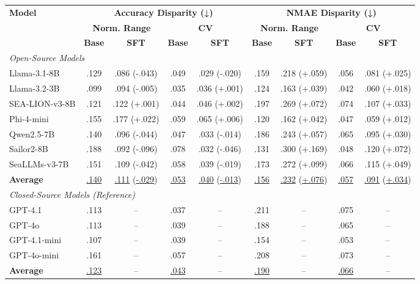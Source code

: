 \begin{tabular}{l|cc|cc|cc|cc}
\toprule
\multirow{3}{*}{\textbf{Model}} & \multicolumn{4}{c|}{\textbf{Accuracy Disparity (↓)}} & \multicolumn{4}{c}{\textbf{NMAE Disparity (↓)}} \\
\cmidrule(lr){2-5} \cmidrule(lr){6-9}
& \multicolumn{2}{c|}{\textbf{Norm. Range}} & \multicolumn{2}{c|}{\textbf{CV}} & \multicolumn{2}{c|}{\textbf{Norm. Range}} & \multicolumn{2}{c}{\textbf{CV}} \\
& \textbf{Base} & \textbf{SFT} & \textbf{Base} & \textbf{SFT} & \textbf{Base} & \textbf{SFT} & \textbf{Base} & \textbf{SFT} \\
\midrule
\multicolumn{9}{l}{\textit{Open-Source Models}} \\
\midrule
Llama-3.1-8B & .129 & .086 (-.043) & .049 & .029 (-.020) & .159 & .218 (+.059) & .056 & .081 (+.025) \\
Llama-3.2-3B & .099 & .094 (-.005) & .035 & .036 (+.001) & .124 & .163 (+.039) & .042 & .060 (+.018) \\
SEA-LION-v3-8B & .121 & .122 (+.001) & .044 & .046 (+.002) & .197 & .269 (+.072) & .074 & .107 (+.033) \\
Phi-4-mini & .155 & .177 (+.022) & .059 & .065 (+.006) & .120 & .162 (+.042) & .047 & .059 (+.012) \\
Qwen2.5-7B & .140 & .096 (-.044) & .047 & .033 (-.014) & .186 & .243 (+.057) & .065 & .095 (+.030) \\
Sailor2-8B & .188 & .092 (-.096) & .078 & .032 (-.046) & .131 & .300 (+.169) & .048 & .120 (+.072) \\
SeaLLMs-v3-7B & .151 & .109 (-.042) & .058 & .039 (-.019) & .173 & .272 (+.099) & .066 & .115 (+.049) \\
\midrule
\textbf{Average} & \underline{.140} & \underline{.111} (\underline{-.029}) & \underline{.053} & \underline{.040} (\underline{-.013}) & \underline{.156} & \underline{.232} (\underline{+.076}) & \underline{.057} & \underline{.091} (\underline{+.034}) \\
\midrule
\multicolumn{9}{l}{\textit{Closed-Source Models (Reference)}} \\
\midrule
GPT-4.1 & .113 & -- & .037 & -- & .211 & -- & .075 & -- \\
GPT-4o & .113 & -- & .039 & -- & .188 & -- & .065 & -- \\
GPT-4.1-mini & .107 & -- & .039 & -- & .154 & -- & .053 & -- \\
GPT-4o-mini & .161 & -- & .057 & -- & .208 & -- & .073 & -- \\
\midrule
\textbf{Average} & \underline{.123} & -- & \underline{.043} & -- & \underline{.190} & -- & \underline{.066} & -- \\
\bottomrule
\end{tabular}
